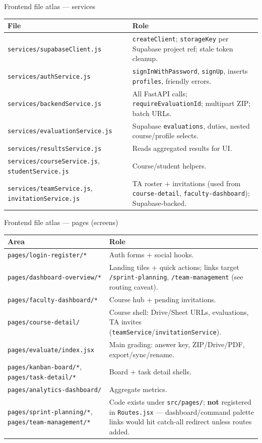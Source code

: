 \documentclass[aspectratio=169]{beamer}
\begin{document}
\begin{frame}{Frontend file atlas --- services}
  \tiny
  \begin{tabular}{@{}p{5.0cm}p{8.8cm}@{}}
    \toprule
    File & Role \\
    \midrule
    \texttt{services/supabaseClient.js} & \texttt{createClient}; \texttt{storageKey} per Supabase project ref; stale token cleanup. \\
    \texttt{services/authService.js} & \texttt{signInWithPassword}, \texttt{signUp}, inserts \texttt{profiles}, friendly errors. \\
    \texttt{services/backendService.js} & All FastAPI calls; \texttt{requireEvaluationId}; multipart ZIP; batch URLs. \\
    \texttt{services/evaluationService.js} & Supabase \texttt{evaluations}, duties, nested course/profile selects. \\
    \texttt{services/resultsService.js} & Reads aggregated results for UI. \\
    \texttt{services/courseService.js}, \texttt{studentService.js} & Course/student helpers. \\
    \texttt{services/teamService.js}, \texttt{invitationService.js} & TA roster + invitations (used from \texttt{course-detail}, \texttt{faculty-dashboard}); Supabase-backed. \\
    \bottomrule
  \end{tabular}
\end{frame}

\begin{frame}{Frontend file atlas --- pages (screens)}
  \tiny
  \begin{tabular}{@{}p{5.2cm}p{8.6cm}@{}}
    \toprule
    Area & Role \\
    \midrule
    \texttt{pages/login-register/*} & Auth forms + social hooks. \\
    \texttt{pages/dashboard-overview/*} & Landing tiles + quick actions; links target \texttt{/sprint-planning}, \texttt{/team-management} (see routing caveat). \\
    \texttt{pages/faculty-dashboard/*} & Course hub + pending invitations. \\
    \texttt{pages/course-detail/} & Course shell: Drive/Sheet URLs, evaluations, TA invites (\texttt{teamService}/\texttt{invitationService}). \\
    \texttt{pages/evaluate/index.jsx} & Main grading: answer key, ZIP/Drive/PDF, export/sync/rename. \\
    \texttt{pages/kanban-board/*}, \texttt{pages/task-detail/*} & Board + task detail shells. \\
    \texttt{pages/analytics-dashboard/} & Aggregate metrics. \\
    \texttt{pages/sprint-planning/*}, \texttt{pages/team-management/*} & Code exists under \texttt{src/pages/}; \textbf{not} registered in \texttt{Routes.jsx} --- dashboard/command palette links would hit catch-all redirect unless routes added. \\
    \bottomrule
  \end{tabular}
\end{frame}
\end{document}
